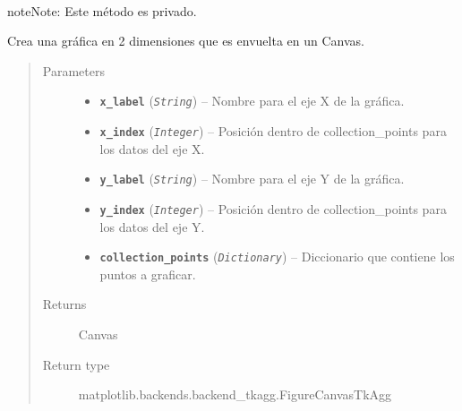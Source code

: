 \documentclass[letterpaper,10pt,english]{sphinxmanual}
\begin{document}
\begin{fulllineitems}
\begin{fulllineitems}
\end{fulllineitems}


\begin{fulllineitems}
\label{View/Additional/ResultsGrapher/GraphFrame:View.Additional.ResultsGrapher.GraphFrame.GraphFrame._GraphFrame__create_2d_canvas}~
\begin{notice}{note}{Note:}
Este método es privado.
\end{notice}

Crea una gráfica en 2 dimensiones que es envuelta en un Canvas.
\begin{quote}\begin{description}
\item[{Parameters}] \leavevmode\begin{itemize}
\item {} 
\textbf{\texttt{x\_label}} (\emph{\texttt{String}}) -- Nombre para el eje X de la gráfica.

\item {} 
\textbf{\texttt{x\_index}} (\emph{\texttt{Integer}}) -- Posición dentro de collection\_points para los datos del eje X.

\item {} 
\textbf{\texttt{y\_label}} (\emph{\texttt{String}}) -- Nombre para el eje Y de la gráfica.

\item {} 
\textbf{\texttt{y\_index}} (\emph{\texttt{Integer}}) -- Posición dentro de collection\_points para los datos del eje Y.

\item {} 
\textbf{\texttt{collection\_points}} (\emph{\texttt{Dictionary}}) -- Diccionario que contiene los puntos a graficar.

\end{itemize}

\item[{Returns}] \leavevmode
Canvas

\item[{Return type}] \leavevmode
matplotlib.backends.backend\_tkagg.FigureCanvasTkAgg

\end{description}\end{quote}


\end{fulllineitems}
\end{fulllineitems}
\end{document}
